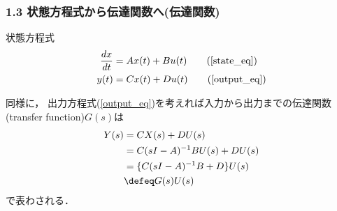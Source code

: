 \begin{frame}[t]
\frametitle{1.3 状態方程式から伝達関数へ(伝達関数)}
状態方程式
\begin{align}
   \frac{dx}{dt} &= A x(t) + B u(t) \tag{\ref{state_eq}} \\
 y(t) &= C x(t) + D u(t) \tag{\ref{output_eq}}
\end{align}

同様に，
出力方程式(\ref{output_eq})を考えれば入力から出力までの伝達関数(transfer function)$G(s)$は
\begin{align}
 Y(s) &= C X(s) + D U(s) \nonumber \\
      &= C (s I - A)^{-1} B U(s) + D U(s) \nonumber \\
      &= \{ C ( s I - A )^{-1} B + D \} U(s) \\
      &\defeq G(s) U(s)
\end{align}
で表わされる．
\end{frame}

